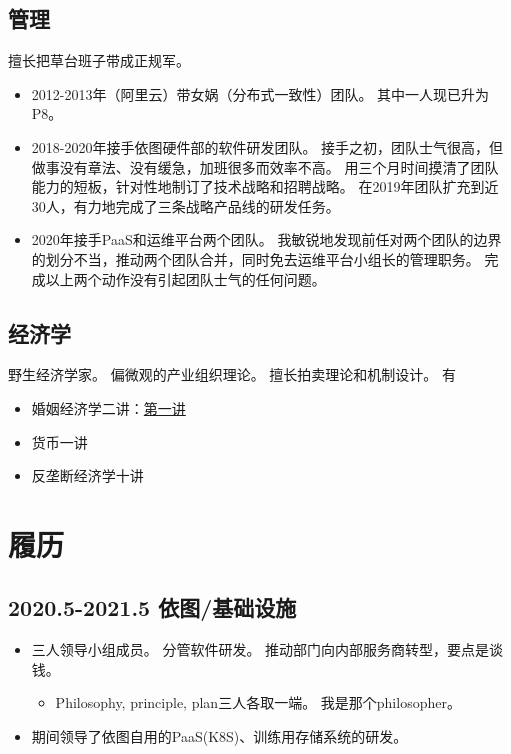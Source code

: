 \documentclass[scheme=plain]{ctexart}
\begin{document}
\subsection{管理}

擅长把草台班子带成正规军。
\begin{itemize}
    \item 2012-2013年（阿里云）带女娲（分布式一致性）团队。
        其中一人现已升为P8。
    \item 2018-2020年接手依图硬件部的软件研发团队。
        接手之初，团队士气很高，但做事没有章法、没有缓急，加班很多而效率不高。
        用三个月时间摸清了团队能力的短板，针对性地制订了技术战略和招聘战略。
        在2019年团队扩充到近30人，有力地完成了三条战略产品线的研发任务。
    \item 2020年接手PaaS和运维平台两个团队。
        我敏锐地发现前任对两个团队的边界的划分不当，推动两个团队合并，同时免去运维平台小组长的管理职务。
        完成以上两个动作没有引起团队士气的任何问题。
\end{itemize}

\subsection{经济学}

野生经济学家。
偏微观的产业组织理论。
擅长拍卖理论和机制设计。
有
\begin{itemize}
    \item 婚姻经济学二讲：\href{https://github.com/TimeExceed/sexsel/blob/master/sexsel.notes.pdf}{第一讲}
    \item 货币一讲
    \item 反垄断经济学十讲
\end{itemize}

\section{履历}

\subsection*{2020.5-2021.5 依图/基础设施}

\begin{itemize}
    \item 三人领导小组成员。
        分管软件研发。
        推动部门向内部服务商转型，要点是谈钱。
        \begin{itemize}
            \item Philosophy, principle, plan三人各取一端。
                我是那个philosopher。
        \end{itemize}
    \item 期间领导了依图自用的PaaS(K8S)、训练用存储系统的研发。
\end{itemize}
\end{document}
